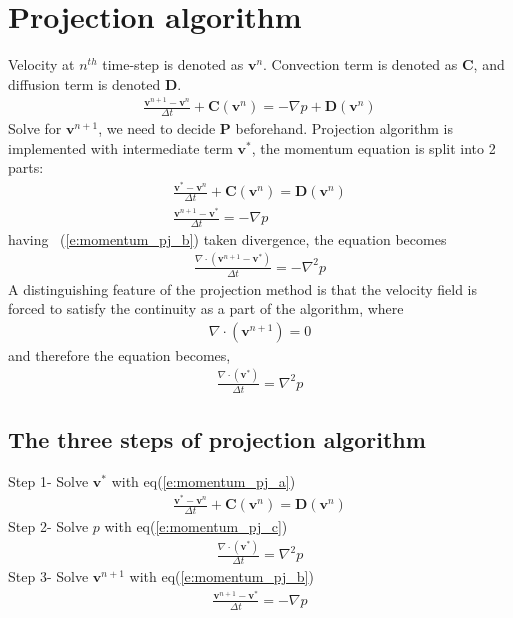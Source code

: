 \documentclass[11pt,dvips]{article}
\numberwithin{equation}{section}
\begin{document}
\section{Projection algorithm}
Velocity at $n^{th}$ time-step is denoted as $\mathbf{v}^n$. Convection term is 
denoted as $\mathbf{C}$, and diffusion term is denoted $\mathbf{D}$.
%
\begin{align}
\frac{\mathbf{v}^{n+1}-\mathbf{v}^{n}}{\Delta t}+\mathbf{C}(\mathbf{v}^{n})=
-\nabla p+\mathbf{D}(\mathbf{v}^{{n}}) \label{e:momentum_pj} 
\end{align}
%
Solve for $\mathbf{v}^{n+1}$, we need to decide $\mathbf{P}$ beforehand. Projection 
algorithm is implemented with intermediate term $\mathbf{v}^{*}$, the momentum 
equation is split into 2 parts: 
%
\begin{gather}
\frac{\mathbf{v}^{*}-\mathbf{v}^{n}}{\Delta t}+\mathbf{C}(\mathbf{v}^{n})=
\mathbf{D}(\mathbf{v}^{{n}})  \label{e:momentum_pj_a}  \\
\frac{\mathbf{v}^{n+1}-\mathbf{v}^{*}}{\Delta t}=-\nabla p \label{e:momentum_pj_b}
\end{gather}
%
having ~(\ref{e:momentum_pj_b}) taken divergence, the equation becomes
%
\begin{align}
\frac{\nabla \cdot(\mathbf{v}^{n+1}-\mathbf{v}^{*})}{\Delta t}=-\nabla ^2 p
\label{e:div_momentum_pj_b}
\end{align}
%
A distinguishing feature of the projection method is that the velocity field is 
forced to satisfy the continuity as a part of the algorithm, where
%
\begin{align}
\nabla \cdot(\mathbf{v}^{n+1})=0 \label{e:continuity_pj}
\end{align}
%
and therefore  the equation becomes, 
%
\begin{align}
\frac{\nabla \cdot(\mathbf{v}^{*})}{\Delta t}=\nabla ^2 p \label{e:momentum_pj_c}
\end{align}
%
\subsection{The three steps of projection algorithm}
Step 1- Solve $\mathbf{v}^{*}$ with eq(\ref{e:momentum_pj_a})
%
\begin{align}
\frac{\mathbf{v}^{*}-\mathbf{v}^{n}}{\Delta t}+\mathbf{C}(\mathbf{v}^{n})=
\mathbf{D}(\mathbf{v}^{{n}})  \nonumber
\end{align}
%
Step 2- Solve $p$ with eq(\ref{e:momentum_pj_c})
%
\begin{align}
\frac{\nabla \cdot(\mathbf{v}^{*})}{\Delta t}=\nabla ^2 p \nonumber
\end{align}
%
Step 3- Solve $\mathbf{v}^{n+1}$  with eq(\ref{e:momentum_pj_b})
%
\begin{align}
\frac{\mathbf{v}^{n+1}-\mathbf{v}^{*}}{\Delta t}=-\nabla p \nonumber
\end{align}
%
\end{document}
